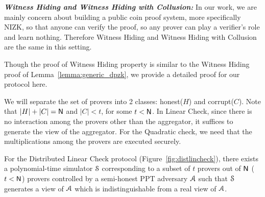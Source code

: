 \noindent\textit{\textbf{Witness Hiding and Witness Hiding with Collusion:}} In our work, we are mainly concern about building a public coin proof system, more specifically NIZK, so that anyone can verify the proof, so any prover can play a verifier's role and learn nothing. Therefore Witness Hiding and Witness Hiding with Collusion are the same in this setting. 

Though the proof of Witness Hiding property is similar to the Witness Hiding proof of Lemma~\ref{lemma:generic_dpzk}, we provide a detailed proof for our protocol here.

We will separate the set of provers into 2 classes: honest($H$) and corrupt($C$). Note that $|H|+|C|=\mathsf{N}$ and $|C|<t$, for some $t<\mathsf{N}$. In Linear Check, since there is no interaction among the provers other than the aggregator, it suffices to generate the view of the aggregator. For the Quadratic check, we need that the multiplications among the provers are executed securely. 
\begin{lemma}\label{lem:WHlin}
	For the Distributed Linear Check protocol (Figure~\ref{fig:distlincheck}), there exists a polynomial-time simulator $\mathcal{S}$ corresponding to a subset of $t$ provers out of $\mathsf{N}$ ($t < \mathsf{N}$) provers controlled by a semi-honest PPT adversary $\mathcal{A}$ such that $\mathcal{S}$ generates a view of $\mathcal{A}$ which is indistinguishable from a real view of $\mathcal{A}$.
\end{lemma}
